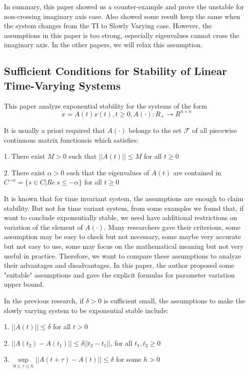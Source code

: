 \documentclass{article}
\begin{document}
In summary, this paper showed us a counter-example and prove the unstable for non-crossing imaginary axis case. Also showed some result keep the same when the system changes from the TI to Slowly Varying case. However, the assumptions in this paper is too strong, especially eigenvalues cannot cross the imaginary axis. In the other papers\cite{solo1994stability}, we will relax this assumption.

\subsection{Sufficient Conditions for Stability of Linear Time-Varying Systems\cite{ilchmann1987sufficient}}
\indent This paper analyze exponential stability for the systems of the form $$\dot{x}=A(t)x(t), t \ge 0, A(\cdot): R_{+} \rightarrow R^{n \times n}$$ 

It is usually a priori required that $A(\cdot)$ belongs to the set $\mathcal{F}$ of all piecewise continuous matrix functionsis which satisfies:

1. There exist $M>0$ such that $||A(t)|| \leq M$ for all $t \ge 0$

2. There exist $\alpha>0$ such that the eigenvalues of $A(t)$ are contained in $C^{-\alpha} = \{s \in C | Re \ s \leq -\alpha \}$ for all $t \ge 0$

It is known that for time invariant system, the assumptions are enough to claim stability. But not for time variant system, from some examples we found that, if want to conclude exponentially stable, we need have additional restrictions on variation of the element of $A(\cdot)$. Many researchers gave their criterions, some assumption may be easy to check but not necessary, some maybe very accurate but not easy to use, some may focus on the mathematical meaning but not very useful in practice. Therefore, we want to compare these assumptions to analyze their advantages and disadvantages. In this paper, the author proposed some "suitable" assumptions and gave the explicit formulas for parameter variation upper bound. 

In the previous research, if $\delta > 0$ is sufficient small, the assumptions to make the slowly varying system to be exponential stable include:

1. $||\dot{A}(t)||\leq \delta$ for all $t > 0$

2. $||A(t_2)-A(t_1)||\leq \delta ||t_2 - t_1||$, for all $t_1,t_2 \geq 0$

3. $\sup\limits_{0\leq \tau \leq h}||A(t+\tau)-A(t)||\leq \delta$ for some $h>0$
\end{document}
